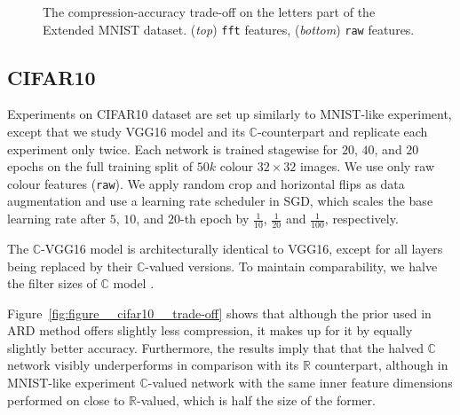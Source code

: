 \documentclass[a4paper,10pt]{article}
\newcommand{\real}{\mathbb{R}}
\newcommand{\cplx}{\mathbb{C}}
\begin{document}
\begin{figure}[!h]
\begin{subfigure}[b]{1.\textwidth}
  \end{subfigure}
  \caption{%
    The compression-accuracy trade-off on the letters part of the Extended MNIST dataset.
    (\textit{top}) \texttt{fft} features, (\textit{bottom}) \texttt{raw} features.
  }
  \label{fig:mnist-like__trade-off__emnist}
\end{figure}



\subsection{CIFAR10} %
\label{sub:cifar10}

Experiments on CIFAR10 dataset are set up similarly to MNIST-like experiment, except
that we study VGG16 model \citep{simonyan_very_2015} and its $\cplx$-counterpart and
replicate each experiment only twice. Each network is trained stagewise for $20$, $40$,
and $20$ epochs on the full training split of $50k$ colour $32\times32$ images. We use
only raw colour features (\texttt{raw}). We apply random crop and horizontal flips as
data augmentation and use a learning rate scheduler in SGD, which scales the base learning
rate after $5$, $10$, and $20$-th epoch by $\tfrac1{10}$, $\tfrac1{20}$ and $\tfrac1{100}$,
respectively.

The $\cplx$-VGG16 model is architecturally identical to VGG16, except for all layers being
replaced by their $\cplx$-valued versions. To maintain comparability, we halve the filter
sizes of $\cplx$ model \citep{monning_evaluation_2018}.

Figure~\ref{fig:figure__cifar10__trade-off} shows that although the prior used in ARD method
offers slightly less compression, it makes up for it by equally slightly better accuracy.
Furthermore, the results imply that that the halved $\cplx$ network visibly underperforms
in comparison with its $\real$ counterpart, although in MNIST-like experiment $\cplx$-valued
network with the same inner feature dimensions performed on close to $\real$-valued, which
is half the size of the former.
\end{document}

